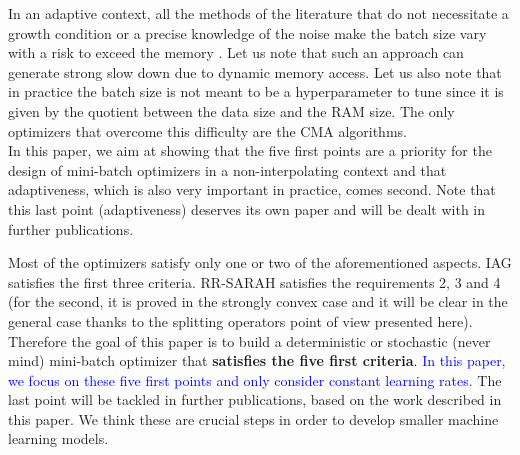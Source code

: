 \documentclass[article,authoryear,jmlmc]{beg_32}             %
\begin{document}
\begin{enumerate}
          In an adaptive context, all the methods of the literature that do
          not necessitate a growth condition or a precise knowledge of the noise make the batch size vary with a risk to exceed the memory
          \cite{armijo_batch_size,armijo_variance_reduction,sto_TR_sampling}. Let us note that such an approach can generate strong slow down due to dynamic memory access. Let us also note that in practice the batch size is not meant to be a hyperparameter to tune since it is given by the quotient between the data size and the RAM size. The only optimizers that overcome this difficulty are the CMA algorithms. \\
          In this paper, we aim at showing that the five first points are a priority for the design of mini-batch optimizers in a non-interpolating context 
          and that adaptiveness, which is also very important in practice, comes second. 
          Note that this last point (adaptiveness) deserves its own paper and will be dealt with in further publications. %
\end{enumerate}
Most of the optimizers satisfy only one or two of the aforementioned aspects. IAG satisfies the first three criteria. RR-SARAH satisfies the requirements 2, 3 and 4 (for the
second, it is proved in the strongly convex case and it will be clear in the general case thanks to the splitting operators point of view presented here). 
Therefore the goal of this paper %
is to build a deterministic or stochastic (never mind) mini-batch optimizer that \textbf{satisfies the five first
criteria}. \textcolor{blue}{In this paper, we focus on these five first points and only consider constant learning rates}. The last point will be tackled in further publications, based on the work described in this paper. We think these are crucial steps in order to develop smaller machine learning models.\\ 

\end{document}
